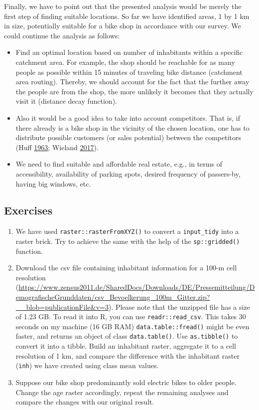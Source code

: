 \documentclass[]{krantz}
\providecommand{\tightlist}{%
  \setlength{\itemsep}{0pt}\setlength{\parskip}{0pt}}
\begin{document}
Finally, we have to point out that the presented analysis would be merely the first step of finding suitable locations.
So far we have identified areas, 1 by 1 km in size, potentially suitable for a bike shop in accordance with our survey.
We could continue the analysis as follows:

\begin{itemize}
\tightlist
\item
  Find an optimal location based on number of inhabitants within a specific catchment area.
  For example, the shop should be reachable for as many people as possible within 15 minutes of traveling bike distance (catchment area routing).
  Thereby, we should account for the fact that the further away the people are from the shop, the more unlikely it becomes that they actually visit it (distance decay function).
\item
  Also it would be a good idea to take into account competitors.
  That is, if there already is a bike shop in the vicinity of the chosen location, one has to distribute possible customers (or sales potential) between the competitors (Huff \protect\hyperlink{ref-huff_probabilistic_1963}{1963}; Wieland \protect\hyperlink{ref-wieland_market_2017}{2017}).
\item
  We need to find suitable and affordable real estate, e.g., in terms of accessibility, availability of parking spots, desired frequency of passers-by, having big windows, etc.
\end{itemize}

\hypertarget{exercises-9}{%
\subsection{Exercises}\label{exercises-9}}

\begin{enumerate}
\def\labelenumi{\arabic{enumi}.}
\item
  We have used \texttt{raster::rasterFromXYZ()} to convert a \texttt{input\_tidy} into a raster brick.
  Try to achieve the same with the help of the \texttt{sp::gridded()} function.
\item
  Download the csv file containing inhabitant information for a 100-m cell resolution (\url{https://www.zensus2011.de/SharedDocs/Downloads/DE/Pressemitteilung/DemografischeGrunddaten/csv_Bevoelkerung_100m_Gitter.zip?__blob=publicationFile\&v=3}).
  Please note that the unzipped file has a size of 1.23 GB.
  To read it into R, you can use \texttt{readr::read\_csv}.
  This takes 30 seconds on my machine (16 GB RAM)
  \texttt{data.table::fread()} might be even faster, and returns an object of class \texttt{data.table()}.
  Use \texttt{as.tibble()} to convert it into a tibble.
  Build an inhabitant raster, aggregate it to a cell resolution of 1 km, and compare the difference with the inhabitant raster (\texttt{inh}) we have created using class mean values.
\item
  Suppose our bike shop predominantly sold electric bikes to older people.
  Change the age raster accordingly, repeat the remaining analyses and compare the changes with our original result.
\end{enumerate}
\end{document}
